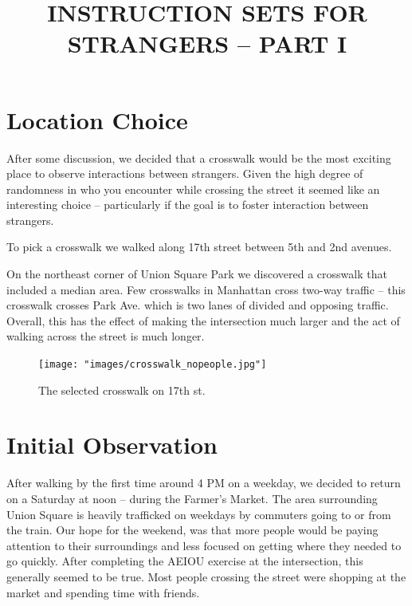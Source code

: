 \documentclass[11pt]{report}
\title{INSTRUCTION SETS FOR STRANGERS -- PART I}
\date{}
\begin{document}
\maketitle
\section*{Location Choice}

After some discussion, we decided that a crosswalk would be the most exciting place to observe interactions between strangers. Given the high degree of randomness in who you encounter while crossing the street it seemed like an interesting choice -- particularly if the goal is to foster interaction between strangers. 

To pick a crosswalk we walked along 17th street between 5th and 2nd avenues. 

On the northeast corner of Union Square Park we discovered a crosswalk that included a median area. Few crosswalks in Manhattan cross two-way traffic -- this crosswalk crosses Park Ave. which is two lanes of divided and opposing traffic. Overall, this has the effect of making the intersection much larger and the act of walking across the street is much longer. 

\begin{figure}[ht]
\centering
\texttt{[image: "images/crosswalk\_nopeople.jpg"]}
\caption{The selected crosswalk on 17th st.}
\label{fig:nopeople}
\end{figure}


\section*{Initial Observation}

After walking by the first time around 4 PM on a weekday, we decided to return on a Saturday at noon -- during the Farmer's Market. The area surrounding Union Square is heavily trafficked on weekdays by commuters going to or from the train. Our hope for the weekend, was that more people would be paying attention to their surroundings and less focused on getting where they needed to go quickly. After completing the AEIOU exercise at the intersection, this generally seemed to be true. Most people crossing the street were shopping at the market and spending time with friends. 
\end{document}
